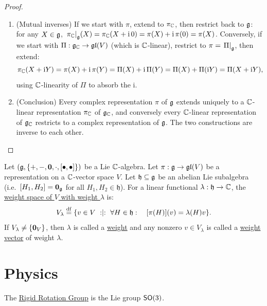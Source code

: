 \documentclass[11pt,reqno]{amsart}
\newcommand{\ii}{\mathrm{i}}
\begin{document}
\begin{proof}
\begin{enumerate}
\item (Mutual inverses)
If we start with $\pi$, extend to $\pi_{\mathbb{C}}$, then restrict back to $\mathfrak{g}$:
for any $X\in\mathfrak{g}$,
$\eval{\pi_\C}_{\g}(X)=\pi_\C(X+\ii\,0)=\pi(X)+\ii\,\pi(0)=\pi(X)$.
Conversely, if we start with $\Pi:\mathfrak{g}_{\mathbb{C}}\to\mathfrak{gl}(V)$ (which is $\mathbb{C}$-linear),
restrict to $\pi=\eval{\Pi}_{\g}$, then extend:
\[
\pi_\C(X+\ii Y)=\pi(X)+\ii\,\pi(Y)=\Pi(X)+\ii\,\Pi(Y)=\Pi(X)+\Pi(\ii Y)=\Pi(X+\ii Y),
\]
using $\mathbb{C}$-linearity of $\Pi$ to absorb the $\ii$.

\item (Conclusion)
Every complex representation $\pi$ of $\mathfrak{g}$ extends uniquely to
a $\mathbb{C}$-linear representation $\pi_{\mathbb{C}}$ of $\mathfrak{g}_{\mathbb{C}}$, and conversely every
$\mathbb{C}$-linear representation of $\mathfrak{g}_{\mathbb{C}}$ restricts to a complex representation
of $\mathfrak{g}$.  The two constructions are inverse to each other.
\end{enumerate}
\end{proof}


\begin{Def}\label{def:weight-space}
Let $\Br{\g,\set{+,-,\bm0,\cdot,\SqBr{\bullet,\bullet}}}$ be a Lie $\mathbb{C}$-algebra.
Let $\pi:\mathfrak{g}\to\mathfrak{gl}(V)$ be a representation on a $\mathbb{C}$-vector space $V$.
Let $\mathfrak{h}\subseteq\mathfrak{g}$ be an abelian Lie subalgebra
(i.e.\ $\SqBr{H_1,H_2}=\bm0_\g$ for all $H_1,H_2\in\mathfrak{h}$).
For a linear functional $\lambda:\mathfrak{h}\to\mathbb{C}$, the
\ul{weight space of $V$ with weight $\lambda$} is:
\[
V_\lambda\df\set{v\in V\st\forall H\in\mathfrak{h}:\quad
\FUNC{\pi(H)}{v}=\lambda(H)v}.
\]
If $V_\lambda\neq\set{\bm0_V}$, then $\lambda$ is called a \ul{weight}
and any nonzero $v\in V_\lambda$ is called a \ul{weight vector} of weight $\lambda$.
\end{Def}


\section{Physics}

\begin{Def}
The \ul{Rigid Rotation Group} is the Lie group $\operatorname{\mathsf{SO}}(3)$.
\end{Def}
\end{document}
